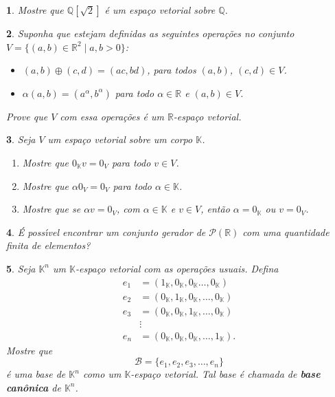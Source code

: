\documentclass[12pt]{exam}
\newtheorem{exercicio}{}
\newcommand{\rac}{\mathbb{Q}}
\newcommand{\real}{\mathbb{R}}
\newcommand{\cp}[1]{\mathbb{#1}}
\begin{document}
\begin{exercicio}
  Mostre que $\rac[\sqrt{2}]$ \'e um espa\c{c}o vetorial sobre $\rac$.
\end{exercicio}

\begin{exercicio}
  Suponha que estejam definidas as seguintes opera\c{c}\~oes no conjunto $V = \{(a, b) \in \real^2 \mid a, b > 0\}$:
  \begin{itemize}
    \item $(a, b) \oplus (c, d) = (ac, bd)$, para todos $(a,b)$, $(c,d) \in V$.
    \item $\alpha (a, b) = (a^\alpha, b^\alpha)$ para todo $\alpha \in \real$ e $(a, b) \in V$.
  \end{itemize}
  Prove que $V$ com essa opera\c{c}\~oes \'e um $\real$-espa\c{c}o vetorial.
\end{exercicio}

\begin{exercicio}
  Seja $V$ um espa\c{c}o vetorial sobre um corpo $\cp{K}$.
  \begin{enumerate}[label={\alph*})]
    \item Mostre que $0_\cp{K} v = 0_V$ para todo $v \in V$.
    \item Mostre que $\alpha 0_V = 0_V$ para todo $\alpha \in \cp{K}$.
    \item Mostre que se $\alpha v = 0_V$, com $\alpha \in \cp{K}$ e $v \in V$, ent\~ao $\alpha = 0_\cp{K}$ ou $v = 0_V$.
  \end{enumerate}
\end{exercicio}


\begin{exercicio}
  \'E poss{\'\i}vel encontrar um conjunto gerador de $\mathcal{P}(\real)$ com uma quantidade finita de elementos?
\end{exercicio}

\begin{exercicio}
  Seja $\cp{K}^n$ um $\cp{K}$-espa\c{c}o vetorial com as opera\c{c}\~oes usuais. Defina
  \begin{align*}
    e_1 &= (1_\cp{K}, 0_\cp{K}, 0_\cp{K} \dots, 0_\cp{K})\\
    e_2 &= (0_\cp{K}, 1_\cp{K}, 0_\cp{K}, \dots, 0_\cp{K})\\
    e_3 &= (0_\cp{K}, 0_\cp{K}, 1_\cp{K}, \dots, 0_\cp{K})\\
    &\vdots\\
    e_n &= (0_\cp{K}, 0_\cp{K}, 0_\cp{K}, \dots, 1_\cp{K}).
  \end{align*}
  Mostre que
  \[
    \mathcal{B} = \{e_1, e_2, e_3, \dots, e_n\}
  \]
  \'e uma base de $\cp{K}^n$ como um $\cp{K}$-espa\c{c}o vetorial. Tal base \'e chamada de \textbf{base can\^onica} de $\cp{K}^n$.
\end{exercicio}
\end{document}
